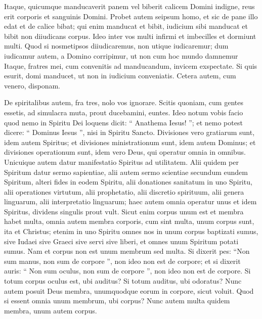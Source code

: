 \begin{biblechapter}
\begin{biblechapter}
\begin{biblechapter}
\begin{biblechapter}
\begin{biblechapter}
\begin{biblechapter}
\begin{biblechapter}
\begin{biblechapter}
\begin{biblechapter}
\begin{biblechapter}
\begin{biblechapter}
\verse Itaque, quicumque manducaverit panem vel biberit calicem Domini indigne, reus erit corporis et sanguinis Domini. 
\verse Probet autem seipsum homo, et sic de pane illo edat et de calice bibat; 
\verse qui enim manducat et bibit, iudicium sibi manducat et bibit non diiudicans corpus. 
\verse Ideo inter vos multi infirmi et imbecilles et dormiunt multi. 
\verse Quod si nosmetipsos diiudicaremus, non utique iudicaremur; 
\verse dum iudicamur autem, a Domino corripimur, ut non cum hoc mundo damnemur 
\verse Itaque, fratres mei, cum convenitis ad manducandum, invicem exspectate. 
\verse Si quis esurit, domi manducet, ut non in iudicium conveniatis. Cetera autem, cum venero, disponam.
 
\begin{biblechapter}
\verse De spiritalibus autem, fra tres, nolo vos ignorare. 
\verse Scitis quoniam, cum gentes essetis, ad simulacra muta, prout ducebamini, euntes. 
\verse Ideo notum vobis facio quod nemo in Spiritu Dei loquens dicit: “ Anathema Iesus! ”; et nemo potest dicere: “ Dominus Iesus ”, nisi in Spiritu Sancto.
 \verse Divisiones vero gratiarum sunt, idem autem Spiritus; 
\verse et divisiones ministrationum sunt, idem autem Dominus; 
\verse et divisiones operationum sunt, idem vero Deus, qui operatur omnia in omnibus. 
\verse Unicuique autem datur manifestatio Spiritus ad utilitatem. 
\verse Alii quidem per Spiritum datur sermo sapientiae, alii autem sermo scientiae secundum eundem Spiritum, 
\verse alteri fides in eodem Spiritu, alii donationes sanitatum in uno Spiritu, 
\verse alii operationes virtutum, alii prophetatio, alii discretio spirituum, alii genera linguarum, alii interpretatio linguarum; 
\verse haec autem omnia operatur unus et idem Spiritus, dividens singulis prout vult.
 \verse Sicut enim corpus unum est et membra habet multa, omnia autem membra corporis, cum sint multa, unum corpus sunt, ita et Christus; 
\verse etenim in uno Spiritu omnes nos in unum corpus baptizati sumus, sive Iudaei sive Graeci sive servi sive liberi, et omnes unum Spiritum potati sumus. 
\verse Nam et corpus non est unum membrum sed multa. 
\verse Si dixerit pes: “Non sum manus, non sum de corpore ”, non ideo non est de corpore; 
\verse et si dixerit auris: “ Non sum oculus, non sum de corpore ”, non ideo non est de corpore. 
\verse Si totum corpus oculus est, ubi auditus? Si totum auditus, ubi odoratus? 
\verse Nunc autem posuit Deus membra, unumquodque eorum in corpore, sicut voluit. 
 \verse Quod si essent omnia unum membrum, ubi corpus? 
\verse Nunc autem multa quidem membra, unum autem corpus. 

\end{biblechapter}
\end{biblechapter}
\end{biblechapter}
\end{biblechapter}
\end{biblechapter}
\end{biblechapter}
\end{biblechapter}
\end{biblechapter}
\end{biblechapter}
\end{biblechapter}
\end{biblechapter}
\end{biblechapter}
